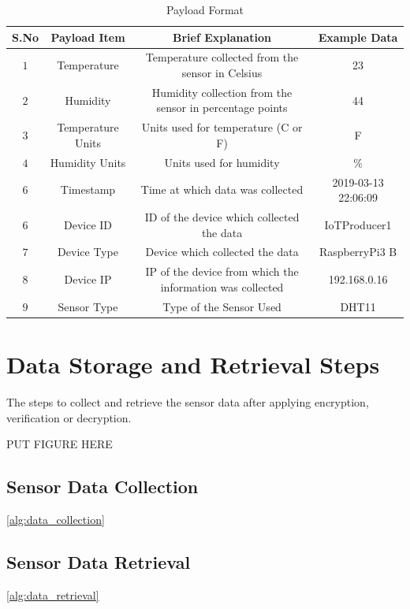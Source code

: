 \documentclass[11pt,openright]{report}
\begin{document}
\begin{table}[!htbp]
	\renewcommand{\arraystretch}{1.3}
	\caption{Payload Format}
	\label{payload_format}
	\centering
	\begin{tabular}{|c|c|c|c|}
		\hline
		\bfseries S.No & \bfseries Payload Item & \bfseries Brief Explanation & \bfseries Example Data \\
		\hline\hline
		$1$ & Temperature & Temperature collected from the sensor in Celsius & 23 \\ \hline
		$2$ & Humidity & Humidity collection from the sensor in percentage points & 44 \\ \hline
		$3$ & Temperature Units & Units used for temperature (C or F) & F \\ \hline
		$4$ & Humidity Units & Units used for humidity & \% \\ \hline
		$6$ & Timestamp & Time at which data was collected & 2019-03-13 22:06:09 \\ \hline
		$6$ & Device ID & ID of the device which collected the data & IoTProducer1 \\ \hline
		$7$ & Device Type & Device which collected the data & RaspberryPi3 B \\ \hline
		$8$ & Device IP & IP of the device from which the information was collected & 192.168.0.16 \\ \hline
		$9$ & Sensor Type & Type of the Sensor Used & DHT11 \\ \hline
	\end{tabular}
\end{table}

\section{Data Storage and Retrieval Steps}
The steps to collect and retrieve the sensor data after applying encryption, verification or decryption.

PUT FIGURE HERE

\subsection{Sensor Data Collection}
\ref{alg:data_collection}
\subsection{Sensor Data Retrieval}
\ref{alg:data_retrieval}
\end{document}
